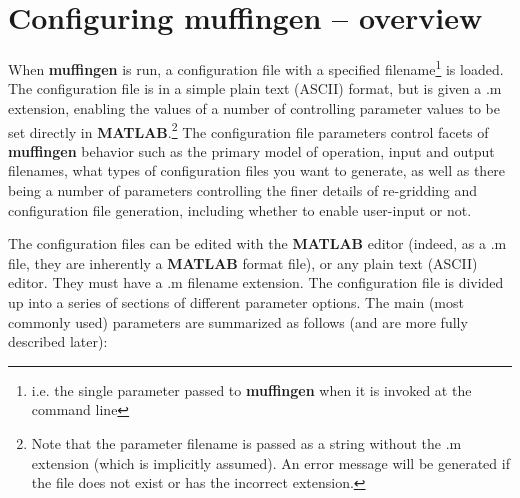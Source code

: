 \documentclass[11pt,fleqn]{book} %
\begin{document}

\newpage

\section{Configuring muffingen -- overview}


When \textbf{muffingen} is run, a configuration file with a specified filename\footnote{i.e. the single parameter passed to \textbf{muffingen} when it is invoked at the command line} is loaded. The configuration file is in a simple plain text (ASCII) format, but is given a \textsf{.m} extension, enabling the values of a number of controlling parameter values to be set directly in \textbf{MATLAB}.\footnote{Note that the parameter filename is passed as a string without the .m extension (which is implicitly assumed). An error message will be generated if the file does not exist or has the incorrect extension.} The configuration file parameters control facets of \textbf{muffingen} behavior such as the primary model of operation, input and output filenames, what types of configuration files you want to generate, as well as there being a number of parameters controlling the finer details of re-gridding and configuration file generation, including whether to enable user-input or not.

The configuration files can be edited with the \textbf{MATLAB} editor (indeed, as a \textsf{\small .m} file, they are inherently a \textbf{MATLAB} format file), or any plain text (ASCII) editor. They must have a \textsf{\small .m} filename extension. 
The configuration file is divided up into a series of sections of different parameter options. The main (most commonly used) parameters are summarized as follows (and are more fully described later):
\end{document}
